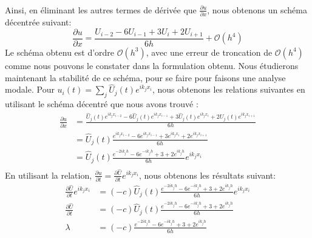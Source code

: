 \documentclass{article}
\begin{document}
\\
Ainsi, en éliminant les autres termes de dérivée que  $\frac{\partial u }{\partial x}$,  nous obtenons un schéma décentrée suivant:\\
\begin{equation}
    \frac{\partial u }{\partial x} = \frac{ U_{i-2} - 6U_{i-1} + 3U_{i} + 2U_{i+1}  }{6h} + \mathcal{O}(h^4)
\end{equation}
Le schéma obtenu est d'ordre $\mathcal{O}(h^3)$, avec une erreur de troncation de $\mathcal{O}(h^4)$ comme nous pouvons le constater dans la formulation obtenu. Nous étudierons maintenant la stabilité de ce schéma, pour se faire pour faisons une analyse modale. Pour $u_i(t) = \sum_j \widehat{U}_j (t) e^{ik_j x_i}$, nous obtenons les relations suivantes en utilisant le schéma décentré que nous avons trouvé :\\
\begin{equation}
    \begin{aligned}
    \frac{\partial u }{\partial x} & = \frac{ \widehat{U}_j (t) e^{ik_j x_{i-2}} - 6\widehat{U}_j (t) e^{ik_j x_{i-1}} + 3\widehat{U}_j (t) e^{ik_j x_{i}} + 2\widehat{U}_j (t) e^{ik_j x_{i+1}}  }{6h} \\
                                   & = \widehat{U}_j (t) \frac{ e^{ik_j x_{i-2}} - 6 e^{ik_j x_{i-1}} + 3 e^{ik_j x_{i}} + 2 e^{ik_j x_{i+1}}  }{6h} \\
                                   & =  \widehat{U}_j (t) \frac{ e^{-2ik_j h} - 6 e^{-ik_j h} + 3 + 2 e^{ik_j h}  }{6h}  e^{ik_j x_{i}} \\
    \end{aligned}
\end{equation}
En utilisant la relation, $\frac{\partial u }{\partial t} = \frac{ \partial \widehat{U} }{ \partial t } e^{ik_j x_{i}}$, nous obtenons les résultats suivant:
\begin{equation}
    \begin{aligned}
         \frac{ \partial \widehat{U} }{ \partial t } e^{ik_j x_{i}} & =  (-c)\widehat{U}_j (t) \frac{ e^{-2ik_j h} - 6 e^{-ik_j h} + 3 + 2 e^{ik_j h}  }{6h}  e^{ik_j x_{i}}\\
          \frac{ \partial \widehat{U} }{ \partial t } & =  (-c)\widehat{U}_j (t) \frac{ e^{-2ik_j h} - 6 e^{-ik_j h} + 3 + 2 e^{ik_j h}  }{6h}\\
          \lambda & =  (-c)\frac{ e^{-2ik_j h} - 6 e^{-ik_j h} + 3 + 2 e^{ik_j h}  }{6h}\\
    \end{aligned}
\end{equation}
\end{document}
